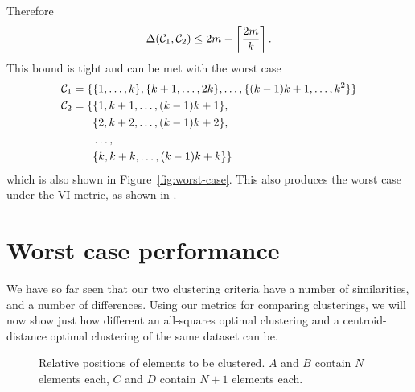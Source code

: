 Therefore
\begin{equation*}
  \Delta(\mathcal{C}_1,\mathcal{C}_2) \leq 2m - \left\lceil \frac{2m}{k} \right\rceil.
\end{equation*}
This bound is tight and can be met with the worst case
\begin{align*}
  \mathcal{C}_1 = \{&\{1,\dotsc,k\},\{k+1,\dotsc,2k\},\dotsc,\{(k-1)k+1,\dotsc,k^2\}\} \\
  \mathcal{C}_2 = \{&\{1,k+1,\dotsc,(k-1)k+1\},\\
  &\{2,k+2,\dotsc,(k-1)k+2\},\\
  &\dotsc,\\
  &\{k,k+k,\dotsc,(k-1)k+k\}\}
\end{align*}
which is also shown in Figure~\ref{fig:worst-case}.  This also produces the
worst case under the VI metric, as shown in \citep{meila-2007}.

\section{Worst case performance}
\label{sec:worst-case-perf}

We have so far seen that our two clustering criteria have a number of
similarities, and a number of differences.  Using our metrics for comparing
clusterings, we will now show just how different an all-squares optimal
clustering and a centroid-distance optimal clustering of the same dataset can
be.

\begin{figure}
  \centering
  \caption{Relative positions of elements to be clustered.  $A$ and $B$
    contain $N$ elements each, $C$ and $D$ contain $N+1$ elements each.}
  \label{fig:clusters}
\end{figure}

